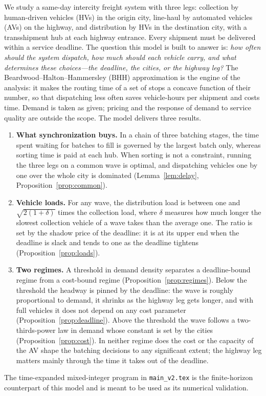 \documentclass[10pt, reqno]{amsart}
\theoremstyle{definition}
\begin{document}
We study a same-day intercity freight system with three legs: collection by human-driven vehicles (HVs) in the origin city, line-haul by automated vehicles (AVs) on the highway, and distribution by HVs in the destination city, with a transshipment hub at each highway entrance. Every shipment must be delivered within a service deadline. The question this model is built to answer is: \emph{how often should the system dispatch, how much should each vehicle carry, and what determines these choices---the deadline, the cities, or the highway leg?} The Beardwood--Halton--Hammersley (BHH) approximation is the engine of the analysis: it makes the routing time of a set of stops a concave function of their number, so that dispatching less often saves vehicle-hours per shipment and costs time. Demand is taken as given; pricing and the response of demand to service quality are outside the scope. The model delivers three results.
\begin{enumerate}
\item \textbf{What synchronization buys.} In a chain of three batching stages, the time spent waiting for batches to fill is governed by the largest batch only, whereas sorting time is paid at each hub. When sorting is not a constraint, running the three legs on a common wave is optimal, and dispatching vehicles one by one over the whole city is dominated (Lemma~\ref{lem:delay}, Proposition~\ref{prop:common}).
\item \textbf{Vehicle loads.} For any wave, the distribution load is between one and $\sqrt{2(1+\delta)}$ times the collection load, where $\delta$ measures how much longer the slowest collection vehicle of a wave takes than the average one. The ratio is set by the shadow price of the deadline: it is at its upper end when the deadline is slack and tends to one as the deadline tightens (Proposition~\ref{prop:loads}).
\item \textbf{Two regimes.} A threshold in demand density separates a deadline-bound regime from a cost-bound regime (Proposition~\ref{prop:regimes}). Below the threshold the headway is pinned by the deadline: the wave is roughly proportional to demand, it shrinks as the highway leg gets longer, and with full vehicles it does not depend on any cost parameter (Proposition~\ref{prop:deadline}). Above the threshold the wave follows a two-thirds-power law in demand whose constant is set by the cities (Proposition~\ref{prop:cost}). In neither regime does the cost or the capacity of the AV shape the batching decisions to any significant extent; the highway leg matters mainly through the time it takes out of the deadline.
\end{enumerate}
The time-expanded mixed-integer program in \texttt{main\_v2.tex} is the finite-horizon counterpart of this model and is meant to be used as its numerical validation.
\end{document}
